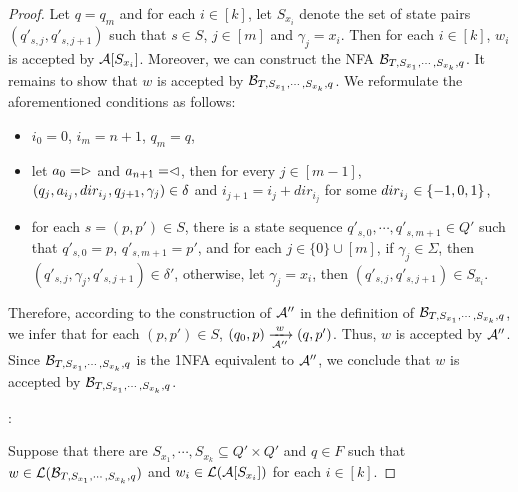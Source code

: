 \begin{proof}
Let $q = q_m$ and for each $i \in [k]$, let $S_{x_i}$ denote the set of state pairs $(q'_{s, j}, q'_{s, j+1})$ such that $s \in S$, $j \in [m]$ and $\gamma_j  = x_i$. 
Then for each $i \in [k]$, $w_i$ is accepted by $\mathcal{A}[S_{x_i}]$.  Moreover, we can construct the NFA $\mathcal{B}_{T, S_{x_1}, \cdots, S_{x_k}, q}$.
It remains to show that $w$ is accepted by $\mathcal{B}_{T, S_{x_1}, \cdots, S_{x_k}, q}$. 
We reformulate the aforementioned conditions as follows: 
%
\begin{itemize}
\item $i_0=0$, $i_m = n+1$, $q_m = q$,
%
\item let $a_0 = \vartriangleright$ and $a_{n+1} = \vartriangleleft$,  then for every $j \in [m-1]$, $(q_j, a_{i_j}, dir_{i_j}, q_{j+1}, \gamma_j) \in
        \delta$ and $i_{j+1} = i_j + dir_{i_j}$ for some $dir_{i_j} \in \{-1, 0, 1\}$, 
 \item  for each $s=(p, p') \in S$, there is a state sequence $q'_{s, 0}, \cdots, q'_{s,m+1} \in Q'$ such that $q'_{s,0}= p$, $q'_{s, m+1} = p'$, and 
 for each $j \in \{0\} \cup [m]$, if $\gamma_j \in \Sigma$, then $(q'_{s, j}, \gamma_j, q'_{s, j+1}) \in \delta'$, otherwise, let $\gamma_j =x_i$, then $(q'_{s, j}, q'_{s, j+1}) \in S_{x_i}$.  
\end{itemize}
Therefore, according to the construction of $\mathcal{A}''$ in the definition of $\mathcal{B}_{T, S_{x_1}, \cdots, S_{x_k}, q}$, we infer that
for each $(p, p') \in S$, $(q_0, p) \xrightarrow[\mathcal{A}'']{w} (q, p')$. Thus, $w$ is accepted by $\mathcal{A}''$. Since  $\mathcal{B}_{T, S_{x_1}, \cdots, S_{x_k}, q}$ is the 1NFA equivalent to $\mathcal{A}''$, we conclude that $w$ is accepted by $\mathcal{B}_{T, S_{x_1}, \cdots, S_{x_k}, q}$.


\smallskip

: 

\smallskip

Suppose that there are $S_{x_1},\cdots, S_{x_k} \subseteq Q' \times Q'$ and $q \in F$ such that $w \in \mathcal{L}(\mathcal{B}_{T, S_{x_1}, \cdots, S_{x_k}, q})$ and $w_i \in \mathcal{L}(\mathcal{A}[S_{x_i}])$ for each $i \in [k]$. 


\end{proof}
